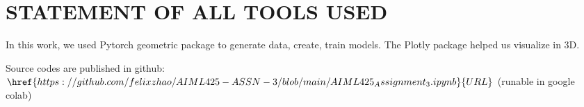\documentclass{article}
\begin{document}
\section{STATEMENT OF ALL TOOLS USED}
\label{sec:statementofalltoolsused}

In this work, we used Pytorch geometric package to generate data, create, train models. 
The Plotly package helped us visualize in 3D. 

Source codes are published in github: 
$\href{https://github.com/felixzhao/AIML425-ASSN-3/blob/main/AIML425_Assignment_3.ipynb}{URL}$
 (runable in google colab)






\vfill\pagebreak



\end{document}
